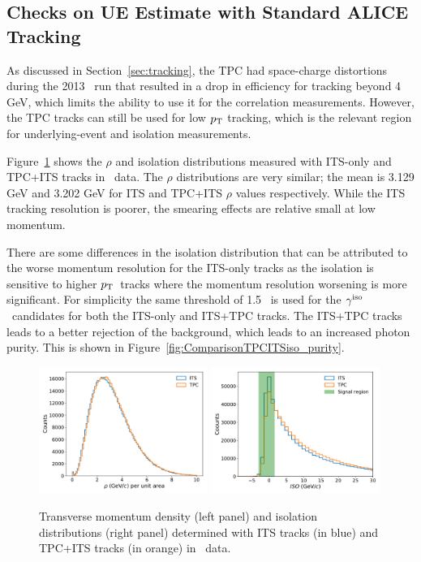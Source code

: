 \subsection{Checks on UE Estimate with Standard ALICE Tracking}
As discussed in Section~\ref{sec:tracking}, the TPC had space-charge distortions during the 2013 \pPb~run that resulted in a drop in efficiency for tracking beyond 4 GeV, which limits the ability to use it for the correlation measurements. However, the TPC tracks can still be used for low $p_{\mathrm{T}}$ tracking, which is the relevant region for underlying-event and isolation measurements. 

Figure~\ref{fig:pPb_its_tpc_rho} shows the $\rho$  and isolation distributions measured with ITS-only and TPC+ITS tracks in \pPb~data. The $\rho$ distributions are very similar; the mean is 3.129 GeV and 3.202 GeV for ITS and TPC+ITS $\rho$ values respectively. While the ITS tracking resolution is poorer, the smearing effects are relative small at low momentum. 

There are some differences in the isolation distribution that can be attributed to the worse momentum resolution for the ITS-only tracks as the isolation is sensitive to higher $p_{\mathrm{T}}$~tracks where the momentum resolution worsening is more significant. For simplicity the same threshold of 1.5 \GeVc~is used for the $\gamma^\mathrm{iso}$~candidates for both the ITS-only and ITS+TPC tracks. The ITS+TPC tracks leads to a better rejection of the background, which leads to an increased photon purity. This is shown in Figure~\ref{fig:ComparisonTPCITSiso_purity}. 

\begin{figure}[hbtp]
	\center
	\includegraphics[width=0.49\textwidth]{Checks_Systematics/UEestimate_Skimmed_13def.pdf}
		\includegraphics[width=0.49\textwidth]{Checks_Systematics/IsolationTPC_Skimmed_13def.pdf}
	\caption{Transverse momentum density (left panel) and isolation distributions (right panel) determined with ITS tracks (in blue) and TPC+ITS tracks (in orange) in \pPb~data.}
	\label{fig:pPb_its_tpc_rho}
\end{figure}


